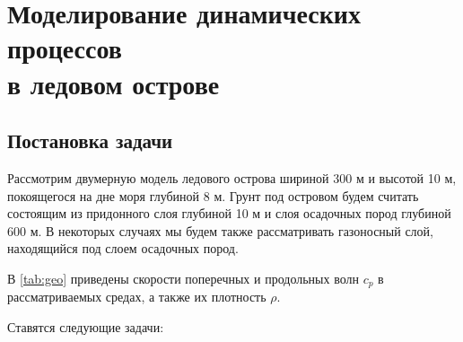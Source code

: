 \section[{Моделирование динамических процессов в ледовом острове}]{Моделирование динамических процессов\\в ледовом острове}

\subsection{Постановка задачи}

Рассмотрим двумерную модель ледового острова шириной 300 м и высотой 10 м, покоящегося на дне моря глубиной 8 м.  Грунт под островом будем считать состоящим из придонного слоя глубиной 10 м и слоя осадочных пород глубиной 600 м. В некоторых случаях мы будем также рассматривать  газоносный слой, находящийся под слоем осадочных пород.  

В \autoref{tab:geo} приведены скорости поперечных и продольных волн $c_p$ в рассматриваемых средах, а также их плотность $\rho$.

Ставятся следующие задачи:

